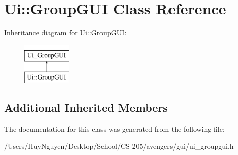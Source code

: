 \hypertarget{classUi_1_1GroupGUI}{}\section{Ui\+:\+:Group\+G\+UI Class Reference}
\label{classUi_1_1GroupGUI}
Inheritance diagram for Ui\+:\+:Group\+G\+UI\+:\begin{figure}[H]
\begin{center}
\leavevmode
\includegraphics[height=2.000000cm]{classUi_1_1GroupGUI}
\end{center}
\end{figure}
\subsection*{Additional Inherited Members}


The documentation for this class was generated from the following file\+:\begin{DoxyCompactItemize}
\item 
/\+Users/\+Huy\+Nguyen/\+Desktop/\+School/\+C\+S 205/avengers/gui/ui\+\_\+groupgui.\+h\end{DoxyCompactItemize}
